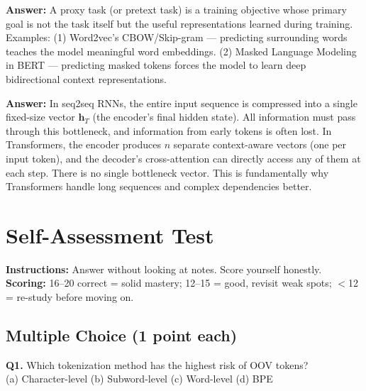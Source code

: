 \documentclass[11pt, a4paper]{article}
\begin{document}
\begin{notebox}
\textbf{Answer:} A proxy task (or pretext task) is a training objective whose primary goal is not the task itself but the useful representations learned during training. Examples: (1) Word2vec's CBOW/Skip-gram --- predicting surrounding words teaches the model meaningful word embeddings. (2) Masked Language Modeling in BERT --- predicting masked tokens forces the model to learn deep bidirectional context representations.
\end{notebox}

\begin{notebox}
\textbf{Answer:} In seq2seq RNNs, the entire input sequence is compressed into a single fixed-size vector $\mathbf{h}_T$ (the encoder's final hidden state). All information must pass through this bottleneck, and information from early tokens is often lost. In Transformers, the encoder produces $n$ separate context-aware vectors (one per input token), and the decoder's cross-attention can directly access any of them at each step. There is no single bottleneck vector. This is fundamentally why Transformers handle long sequences and complex dependencies better.
\end{notebox}

\newpage
\section{Self-Assessment Test}

\textbf{Instructions:} Answer without looking at notes. Score yourself honestly.\\
\textbf{Scoring:} 16--20 correct = solid mastery; 12--15 = good, revisit weak spots; $<$12 = re-study before moving on.

\subsection*{Multiple Choice (1 point each)}

\textbf{Q1.} Which tokenization method has the highest risk of OOV tokens?\\
(a) Character-level \quad (b) Subword-level \quad (c) Word-level \quad (d) BPE
\end{document}
